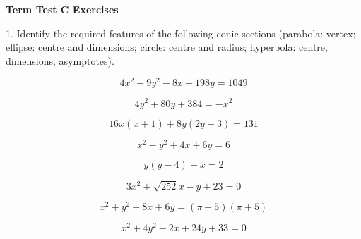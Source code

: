 \documentclass[11pt]{article}
\begin{document}
\textbf{Term Test C Exercises}

1. Identify the required features of the following conic sections
(parabola: vertex; ellipse: centre and dimensions; circle: centre and
radius; hyperbola: centre, dimensions, asymptotes).

\begin{equation}
  \label{eq:ohdiedoe}
4x^{2}-9y^{2}-8x-198y=1049
\end{equation}

\begin{equation}
  \label{eq:mahbeizo}
4y^{2}+80y+384=-x^{2}
\end{equation}

\begin{equation}
  \label{eq:ohwoojie}
16x(x+1)+8y(2y+3)=131
\end{equation}

\begin{equation}
  \label{eq:chohtohk}
x^{2}-y^{2}+4x+6y=6
\end{equation}

\begin{equation}
  \label{eq:gofushoo}
y(y-4)-x=2
\end{equation}

\begin{equation}
  \label{eq:vibeibie}
3x^{2}+\sqrt{252}x-y+23=0
\end{equation}

\begin{equation}
  \label{eq:aepheipi}
x^{2}+y^{2}-8x+6y=(\pi-5)(\pi+5)
\end{equation}

\begin{equation}
  \label{eq:vogeobab}
x^{2}+4y^{2}-2x+24y+33=0
\end{equation}
\end{document}
